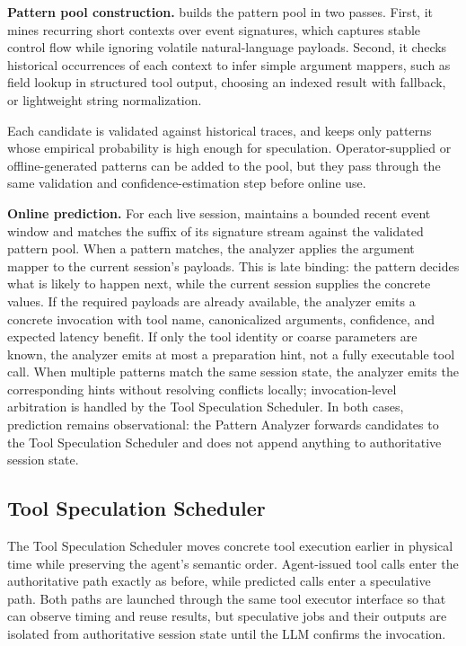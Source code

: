 \noindent\textbf{Pattern pool construction.}
\sys builds the pattern pool in two passes.
First, it mines recurring short contexts over event signatures, which captures stable control flow while ignoring volatile natural-language payloads.
Second, it checks historical occurrences of each context to infer simple argument mappers, such as field lookup in structured tool output, choosing an indexed result with fallback, or lightweight string normalization.

Each candidate is validated against historical traces, and \sys keeps only patterns whose empirical probability is high enough for speculation.
Operator-supplied or offline-generated patterns can be added to the pool, but they pass through the same validation and confidence-estimation step before online use.

\noindent\textbf{Online prediction.}
For each live session, \sys maintains a bounded recent event window and matches the suffix of its signature stream against the validated pattern pool.
When a pattern matches, the analyzer applies the argument mapper to the current session's payloads.
This is late binding: the pattern decides what is likely to happen next, while the current session supplies the concrete values.
If the required payloads are already available, the analyzer emits a concrete invocation with tool name, canonicalized arguments, confidence, and expected latency benefit.
If only the tool identity or coarse parameters are known, the analyzer emits at most a preparation hint, not a fully executable tool call.
When multiple patterns match the same session state, the analyzer emits the corresponding hints without resolving conflicts locally; invocation-level arbitration is handled by the Tool Speculation Scheduler.
In both cases, prediction remains observational: the Pattern Analyzer forwards candidates to the Tool Speculation Scheduler and does not append anything to authoritative session state.

\subsection{Tool Speculation Scheduler}
\label{sec:design-tool-speculation-scheduler}

The Tool Speculation Scheduler moves concrete tool execution earlier in physical time while preserving the agent's semantic order.
Agent-issued tool calls enter the authoritative path exactly as before, while predicted calls enter a speculative path.
Both paths are launched through the same tool executor interface so that \sys can observe timing and reuse results, but speculative jobs and their outputs are isolated from authoritative session state until the LLM confirms the invocation.

